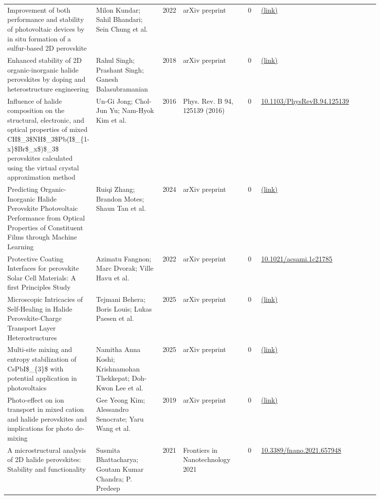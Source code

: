 \documentclass[10pt,a4paper]{article}
\begin{document}
{\begin{longtable}{p{0.197\linewidth}p{0.197\linewidth}p{0.043\linewidth}p{0.197\linewidth}p{0.043\linewidth}p{0.117\linewidth}p{0.098\linewidth}}
Improvement of both performance and stability of photovoltaic devices by in situ formation of a sulfur-based 2D perovskite & Milon Kundar; Sahil Bhandari; Sein Chung et al. & 2022 & arXiv preprint & 0 & \href{http://arxiv.org/abs/2211.15236v1}{(link)} &  \\
Enhanced stability of 2D organic-inorganic halide perovskites by doping and heterostructure engineering & Rahul Singh; Prashant Singh; Ganesh Balasubramanian & 2018 & arXiv preprint & 0 & \href{http://arxiv.org/abs/1807.01221v2}{(link)} &  \\
Influence of halide composition on the structural, electronic, and optical properties of mixed CH\$\_3\$NH\$\_3\$Pb(I\$\_\{1-x\}\$Br\$\_x\$)\$\_3\$ perovskites calculated using the virtual crystal approximation method & Un-Gi Jong; Chol-Jun Yu; Nam-Hyok Kim et al. & 2016 & Phys. Rev. B 94, 125139 (2016) & 0 & \href{https://doi.org/10.1103/PhysRevB.94.125139}{10.1103/PhysRevB.94.125139} &  \\
Predicting Organic-Inorganic Halide Perovskite Photovoltaic Performance from Optical Properties of Constituent Films through Machine Learning & Ruiqi Zhang; Brandon Motes; Shaun Tan et al. & 2024 & arXiv preprint & 0 & \href{http://arxiv.org/abs/2412.09638v1}{(link)} &  \\
Protective Coating Interfaces for perovskite Solar Cell Materials: A first Principles Study & Azimatu Fangnon; Marc Dvorak; Ville Havu et al. & 2022 & arXiv preprint & 0 & \href{https://doi.org/10.1021/acsami.1c21785}{10.1021/acsami.1c21785} &  \\
Microscopic Intricacies of Self-Healing in Halide Perovskite-Charge Transport Layer Heterostructures & Tejmani Behera; Boris Louis; Lukas Paesen et al. & 2025 & arXiv preprint & 0 & \href{http://arxiv.org/abs/2510.11948v1}{(link)} &  \\
Multi-site mixing and entropy stabilization of CsPbI\$\_\{3\}\$ with potential application in photovoltaics & Namitha Anna Koshi; Krishnamohan Thekkepat; Doh-Kwon Lee et al. & 2025 & arXiv preprint & 0 & \href{http://arxiv.org/abs/2504.18272v1}{(link)} &  \\
Photo-effect on ion transport in mixed cation and halide perovskites and implications for photo de-mixing & Gee Yeong Kim; Alessandro Senocrate; Yaru Wang et al. & 2019 & arXiv preprint & 0 & \href{http://arxiv.org/abs/1912.09777v1}{(link)} &  \\
A microstructural analysis of 2D halide perovskites: Stability and functionality & Susmita Bhattacharya; Goutam Kumar Chandra; P. Predeep & 2021 & Frontiers in Nanotechnology 2021 & 0 & \href{https://doi.org/10.3389/fnano.2021.657948}{10.3389/fnano.2021.657948} &  \\

\end{longtable}}
\end{document}
